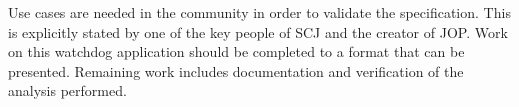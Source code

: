 Use cases are needed in the community in order to validate the specification. This is explicitly stated by one of the key people of SCJ and the creator of JOP\cite{Schoeberl:2012:SCJonJava}. Work on this watchdog application should be completed to a format that can be presented. Remaining work includes documentation and verification of the analysis performed.



